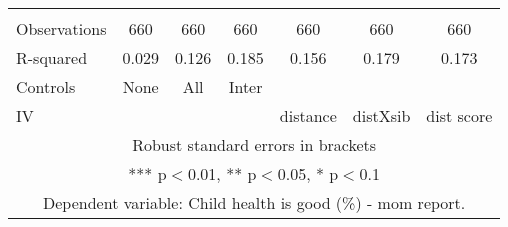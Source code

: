 \begin{tabular}{lcccccc}
 &  &  &  &  &  &  \\
Observations & 660 & 660 & 660 & 660 & 660 & 660 \\
R-squared & 0.029 & 0.126 & 0.185 & 0.156 & 0.179 & 0.173 \\
Controls & None & All & Inter &  &  &  \\
 IV &  &  &  & distance & distXsib & dist score \\ \hline
\multicolumn{7}{c}{ Robust standard errors in brackets} \\
\multicolumn{7}{c}{ *** p$<$0.01, ** p$<$0.05, * p$<$0.1} \\
\multicolumn{7}{c}{ Dependent variable: Child health is good (\%) - mom report.} \\
\end{tabular}
